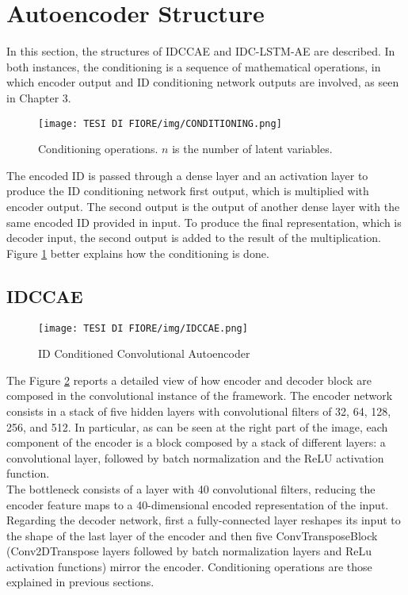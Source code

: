 \section{Autoencoder Structure}
In this section, the structures of IDCCAE and IDC-LSTM-AE are described. In both instances, the conditioning is a sequence of mathematical operations, in which encoder output and ID conditioning network outputs are involved, as seen in Chapter 3.

\begin{figure}[ht]
\texttt{[image: TESI DI FIORE/img/CONDITIONING.png]}
\centering
\caption{Conditioning operations. $n$ is the number of latent variables.}
\label{conditioning}
\end{figure}

The encoded ID is passed through a dense layer and an activation layer to produce the ID conditioning network first output, which is multiplied with encoder output. The second output is the output of another dense layer with the same encoded ID provided in input. To produce the final representation, which is decoder input, the second output is added to the result of the multiplication. Figure \ref{conditioning} better explains how the conditioning is done.

\subsection{IDCCAE}

\begin{figure}[ht]
\texttt{[image: TESI DI FIORE/img/IDCCAE.png]}
\centering
\caption{ID Conditioned Convolutional Autoencoder}
\label{IDCCAE}
\end{figure}

The Figure \ref{IDCCAE} reports a detailed view of how encoder and decoder block are composed in the convolutional instance of the framework. The encoder network consists in a stack of five hidden layers with convolutional filters of 32, 64, 128, 256, and 512. In particular, as can be seen at the right part of the image, each component of the encoder is a block composed by a stack of different layers: a convolutional layer, followed by batch normalization and the ReLU activation function.\\
The bottleneck consists of a layer with 40 convolutional filters, reducing the encoder feature maps to a 40-dimensional encoded representation of the input. Regarding the decoder network, first a fully-connected layer reshapes its input to the shape of the last layer of the encoder and then five ConvTransposeBlock (Conv2DTranspose layers followed by batch normalization layers and ReLu activation functions) mirror the encoder. Conditioning operations are those explained in previous sections.

